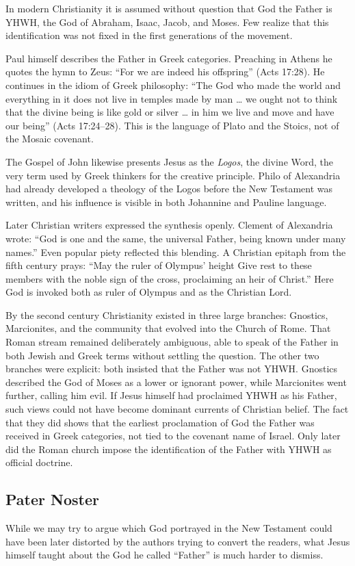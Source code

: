 In modern Christianity it is assumed without question that God the Father is YHWH, the God of Abraham, Isaac, Jacob, and Moses.
Few realize that this identification was not fixed in the first generations of the movement.

Paul himself describes the Father in Greek categories.
Preaching in Athens he quotes the hymn to Zeus: “For we are indeed his offspring” (Acts 17:28).
He continues in the idiom of Greek philosophy: “The God who made the world and everything in it does not live in temples made by man … we ought not to think that the divine being is like gold or silver … in him we live and move and have our being” (Acts 17:24–28).
This is the language of Plato and the Stoics, not of the Mosaic covenant.

The Gospel of John likewise presents Jesus as the \emph{Logos}, the divine Word, the very term used by Greek thinkers for the creative principle.
Philo of Alexandria had already developed a theology of the Logos before the New Testament was written, and his influence is visible in both Johannine and Pauline language.

Later Christian writers expressed the synthesis openly.
Clement of Alexandria wrote: “God is one and the same, the universal Father, being known under many names.”
Even popular piety reflected this blending.
A Christian epitaph from the fifth century prays:
“May the ruler of Olympus’ height
Give rest to these members with the noble sign of the cross,
proclaiming an heir of Christ.”
Here God is invoked both as ruler of Olympus and as the Christian Lord.

By the second century Christianity existed in three large branches: Gnostics, Marcionites, and the community that evolved into the Church of Rome.
That Roman stream remained deliberately ambiguous, able to speak of the Father in both Jewish and Greek terms without settling the question.
The other two branches were explicit: both insisted that the Father was not YHWH.
Gnostics described the God of Moses as a lower or ignorant power, while Marcionites went further, calling him evil.
If Jesus himself had proclaimed YHWH as his Father, such views could not have become dominant currents of Christian belief.
The fact that they did shows that the earliest proclamation of God the Father was received in Greek categories, not tied to the covenant name of Israel.
Only later did the Roman church impose the identification of the Father with YHWH as official doctrine.

\subsection{Pater Noster}\label{subsec:pater-noster}
While we may try to argue which God portrayed in the New Testament could have been later distorted by the authors trying to convert the readers, what Jesus himself taught about the God he called “Father” is much harder to dismiss.


